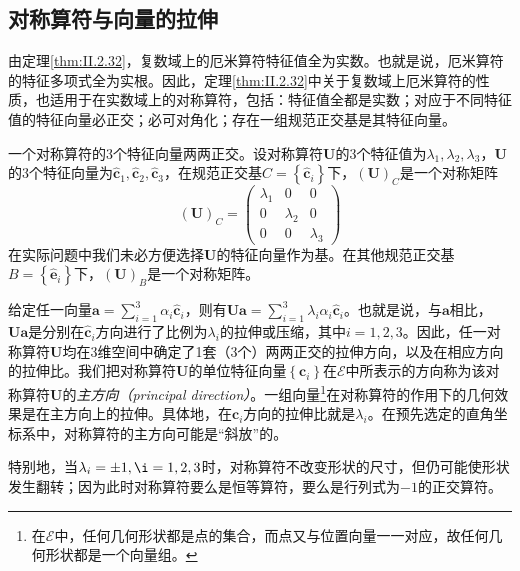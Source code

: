 \documentclass[main.tex]{subfiles}
\begin{document}
\subsection{对称算符与向量的拉伸}
由定理\ref{thm:II.2.32}，复数域上的厄米算符特征值全为实数。也就是说，厄米算符的特征多项式全为实根。因此，定理\ref{thm:II.2.32}中关于复数域上厄米算符的性质，也适用于在实数域上的对称算符，包括：特征值全都是实数\cite[\S 5.3 定理3.4]{周胜林2012线性代数}；对应于不同特征值的特征向量必正交\cite[\S 5.3 定理3.5]{周胜林2012线性代数}；必可对角化\cite[\S 5.3 定理3.6]{周胜林2012线性代数}；存在一组规范正交基是其特征向量。

一个对称算符的3个特征向量两两正交。设对称算符$\mathbf{U}$的3个特征值为$\lambda_1,\lambda_2,\lambda_3$，$\mathbf{U}$的3个特征向量为$\mathbf{\hat{c}}_1,\mathbf{\hat{c}}_2,\mathbf{\hat{c}}_3$，在规范正交基$C=\left\{\mathbf{\hat{c}}_i\right\}$下，$\left(\mathbf{U}\right)_C$是一个对称矩阵
\[
    \left(\mathbf{U}\right)_C=\left(\begin{array}{ccc}\lambda_1&0&0\\0&\lambda_2&0\\0&0&\lambda_3\end{array}\right)
\]
在实际问题中我们未必方便选择$\mathbf{U}$的特征向量作为基。在其他规范正交基$B=\left\{\mathbf{\hat{e}}_i\right\}$下，$\left(\mathbf{U}\right)_B$是一个对称矩阵。

给定任一向量$\mathbf{a}=\sum_{i=1}^3\alpha_i\mathbf{\hat{c}}_i$，则有$\mathbf{Ua}=\sum_{i=1}^3\lambda_i\alpha_i\mathbf{\hat{c}}_i$。也就是说，与$\mathbf{a}$相比，$\mathbf{Ua}$是分别在$\mathbf{\hat{c}}_i$方向进行了比例为$\lambda_i$的拉伸或压缩，其中$i=1,2,3$。因此，任一对称算符$\mathbf{U}$均在3维空间中确定了1套（3个）两两正交的拉伸方向，以及在相应方向的拉伸比。我们把对称算符$\mathbf{U}$的单位特征向量$\left\{\mathbf{c}_i\right\}$在$\mathcal{E}$中所表示的方向称为该对称算符$\mathbf{U}$的\emph{主方向（principal direction）}。一组向量\footnote{在$\mathcal{E}$中，任何几何形状都是点的集合，而点又与位置向量一一对应，故任何几何形状都是一个向量组。}在对称算符的作用下的几何效果是在主方向上的拉伸。具体地，在$\mathbf{c}_i$方向的拉伸比就是$\lambda_i$。在预先选定的直角坐标系中，对称算符的主方向可能是“斜放”的。

特别地，当$\lambda_i=\pm 1,\i=1,2,3$时，对称算符不改变形状的尺寸，但仍可能使形状发生翻转；因为此时对称算符要么是恒等算符，要么是行列式为$-1$的正交算符。
\end{document}
